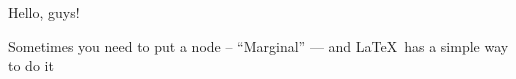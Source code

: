 \documentclass{article}
\begin{document}
\noindent Hello, guys!\par
\noindent Sometimes you need to put a node -- ``Marginal'' \marginpar{!!!} --- and \LaTeX\ has a simple way to do it
\end{document}
